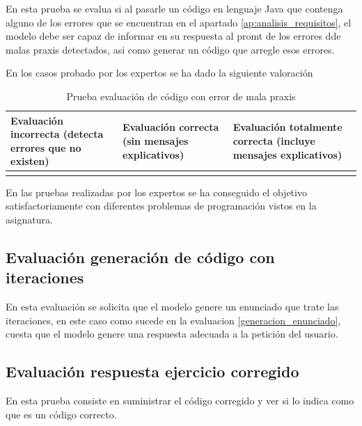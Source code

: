 En esta prueba se evalua si al pasarle un código en lenguaje Java que contenga alguno de los errores que se encuentran en el apartado \ref{ap:analisis_requisitos}, el modelo debe ser capaz de informar en su respuesta al promt de los errores dde malas praxis detectados, asi como generar un código que arregle esos errores.

En los casos probado por los expertos se ha dado la siguiente valoración

\begin{table}[htb]
    \centering
    \begin{tabular}{| >{\arraybackslash}m{}| >{\arraybackslash}m{} | >{\arraybackslash}m{}|} \hline
    \vspace{0.5em}  Evaluación incorrecta (detecta errores que no existen) \vspace{0.5em} &  Evaluación correcta (sin mensajes explicativos) & Evaluación totalmente correcta (incluye mensajes explicativos) \\ \hline
     &  & \multicolumn{1}{|c|}{X} \\ \hline 
    \end{tabular}\caption{Prueba evaluación de código con error de mala praxis}
    \label{tabla:evaluacion-ej1}
\end{table}

En las pruebas realizadas por los expertos se ha conseguido el objetivo satisfactoriamente con diferentes problemas de programación vistos en la asignatura.

\subsection{Evaluación generación de código con iteraciones}

En esta evaluación se solicita que el modelo genere un enunciado que trate las iteraciones, en este caso como sucede en la evaluacion \ref{generacion_enunciado}, cuesta que el modelo genere una respuesta adecuada a la petición del usuario.


\subsection{Evaluación respuesta ejercicio corregido}

En esta prueba consiste en suministrar el código corregido y ver si lo indica como que es un código correcto.

